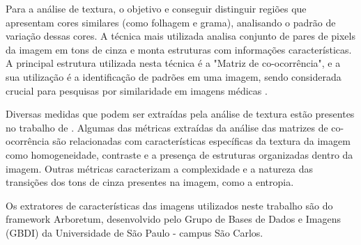 Para a análise de textura, o objetivo e conseguir distinguir regiões que apresentam cores similares (como folhagem e grama), analisando o padrão
de variação dessas cores. A técnica mais utilizada analisa conjunto de pares de pixels da imagem em tons de cinza e monta estruturas com informações características.
A principal estrutura utilizada nesta técnica é a "Matriz de co-ocorrência", e a sua utilização é a identificação de padrões
em uma imagem, sendo considerada crucial para pesquisas por similaridade em imagens médicas \cite{Glatard2004}.\par
												
Diversas medidas que podem ser extraídas pela análise de textura estão presentes no trabalho de \cite{Haralick1973}. Algumas das métricas extraídas
da análise das matrizes de co-ocorrência são  relacionadas com características específicas da textura da imagem como homogeneidade, contraste
e a presença de estruturas organizadas dentro da imagem. Outras métricas caracterizam a complexidade e a natureza das transições dos tons de cinza presentes
na imagem, como a entropia.\par

Os extratores de características das imagens utilizados neste trabalho são do framework Arboretum, desenvolvido pelo Grupo de Bases de Dados e Imagens (GBDI) da Universidade de São Paulo - campus São Carlos.


